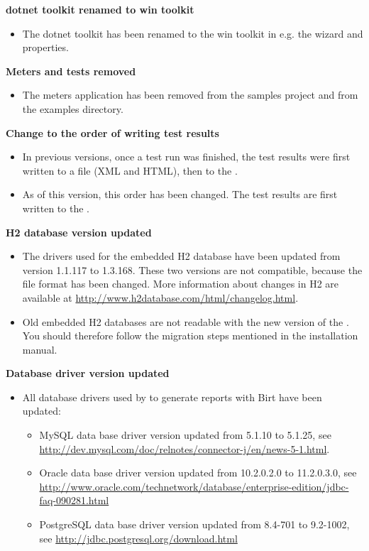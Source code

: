 \textbf{dotnet toolkit renamed to win toolkit}
\begin{itemize}
\item The dotnet toolkit has been renamed to the win toolkit in e.g. the \gdproject{} wizard and properties.
\end{itemize}

\textbf{Meters \gdaut{} and tests removed}
\begin{itemize}
\item The meters application has been removed from the samples project and from the examples directory.
\end{itemize}

\textbf{Change to the order of writing test results}
\begin{itemize}
\item In previous versions, once a test run was finished, the test results were first written to a file (XML and HTML), then to the \gddb{}.
\item As of this version, this order has been changed. The test results are first written to the \gddb{}.
\end{itemize}


\textbf{H2 database version updated}
\begin{itemize}
\item The drivers used for the embedded H2 database have been updated from version 1.1.117 to 1.3.168. These two versions are not compatible, because the file format has been changed. More information about changes in H2 are available at \url{http://www.h2database.com/html/changelog.html}.
\item Old embedded H2 databases are not readable with the new version
    of the \ite{}. You should therefore follow the migration steps mentioned in the installation manual. 
 
\end{itemize}

\textbf{Database driver version updated}
\begin{itemize}
\item All database drivers used by \ite to generate reports with Birt have been
    updated:
    \begin{itemize}
    \item MySQL data base driver version updated from 5.1.10 to 5.1.25,
        see \url{http://dev.mysql.com/doc/relnotes/connector-j/en/news-5-1.html}.
    \item Oracle data base driver version updated from 10.2.0.2.0 to 11.2.0.3.0,
        see \url{http://www.oracle.com/technetwork/database/enterprise-edition/jdbc-faq-090281.html}
    \item PostgreSQL data base driver version updated from 8.4-701 to 9.2-1002,
        see \url{http://jdbc.postgresql.org/download.html}
    \end{itemize}
\end{itemize}

